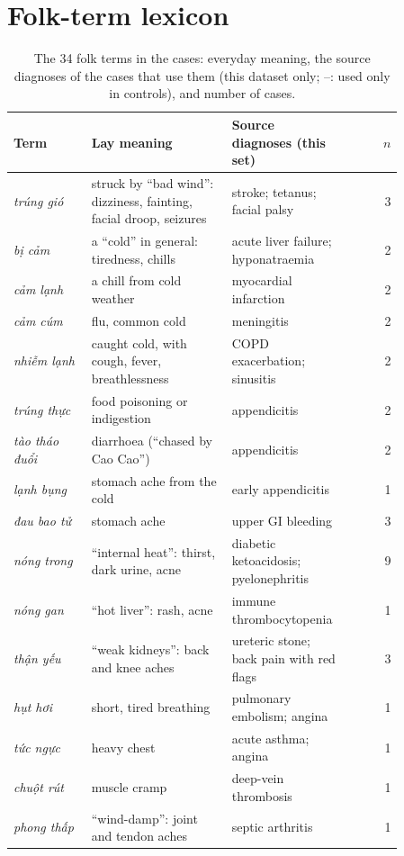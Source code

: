\documentclass[runningheads]{llncs}
\newcommand{\vi}[1]{\textit{#1}}   %
\begin{document}
\section{Folk-term lexicon}\label{app:lexicon}
\begin{table}[h]\centering\scriptsize
\caption{The 34 folk terms in the cases: everyday meaning, the source diagnoses of the cases that use them (this dataset only; --: used only in controls), and number of cases.}\label{tab:lexicon}
\begin{tabular}{p{0.2\linewidth}p{0.36\linewidth}p{0.3\linewidth}r}\toprule
Term & Lay meaning & Source diagnoses (this set) & $n$ \\\midrule
\vi{trúng gió} & struck by ``bad wind'': dizziness, fainting, facial droop, seizures & stroke; tetanus; facial palsy & 3 \\
\vi{bị cảm} & a ``cold'' in general: tiredness, chills & acute liver failure; hyponatraemia & 2 \\
\vi{cảm lạnh} & a chill from cold weather & myocardial infarction & 2 \\
\vi{cảm cúm} & flu, common cold & meningitis & 2 \\
\vi{nhiễm lạnh} & caught cold, with cough, fever, breathlessness & COPD exacerbation; sinusitis & 2 \\
\vi{trúng thực} & food poisoning or indigestion & appendicitis & 2 \\
\vi{tào tháo đuổi} & diarrhoea (``chased by Cao Cao'') & appendicitis & 2 \\
\vi{lạnh bụng} & stomach ache from the cold & early appendicitis & 1 \\
\vi{đau bao tử} & stomach ache & upper GI bleeding & 3 \\
\vi{nóng trong} & ``internal heat'': thirst, dark urine, acne & diabetic ketoacidosis; pyelonephritis & 9 \\
\vi{nóng gan} & ``hot liver'': rash, acne & immune thrombocytopenia & 1 \\
\vi{thận yếu} & ``weak kidneys'': back and knee aches & ureteric stone; back pain with red flags & 3 \\
\vi{hụt hơi} & short, tired breathing & pulmonary embolism; angina & 1 \\
\vi{tức ngực} & heavy chest & acute asthma; angina & 1 \\
\vi{chuột rút} & muscle cramp & deep-vein thrombosis & 1 \\
\vi{phong thấp} & ``wind-damp'': joint and tendon aches & septic arthritis & 1 \\

\end{tabular}
\end{table}
\end{document}
